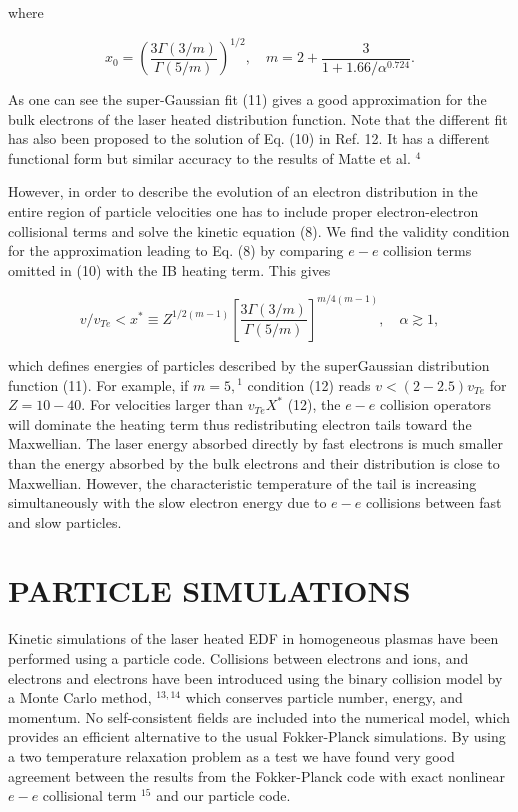\documentclass[10pt]{article}
\begin{document}
where

$$
x_{0}=\left(\frac{3 \Gamma(3 / m)}{\Gamma(5 / m)}\right)^{1 / 2}, \quad m=2+\frac{3}{1+1.66 / \alpha^{0.724}} .
$$

As one can see the super-Gaussian fit (11) gives a good approximation for the bulk electrons of the laser heated distribution function. Note that the different fit has also been proposed to the solution of Eq. (10) in Ref. 12. It has a different functional form but similar accuracy to the results of Matte et al. ${ }^{4}$

However, in order to describe the evolution of an electron distribution in the entire region of particle velocities one has to include proper electron-electron collisional terms and solve the kinetic equation (8). We find the validity condition for the approximation leading to Eq. (8) by comparing $e-e$ collision terms omitted in (10) with the IB heating term. This gives

$$
v / v_{T e}<x^{*} \equiv Z^{1 / 2(m-1)}\left[\frac{3 \Gamma(3 / m)}{\Gamma(5 / m)}\right]^{m / 4(m-1)}, \quad \alpha \gtrsim 1,
$$

which defines energies of particles described by the superGaussian distribution function (11). For example, if $m=5,{ }^{1}$ condition (12) reads $v<(2-2.5) v_{T e}$ for $Z=10-40$. For velocities larger than $v_{T e} X^{*}$ (12), the $e-e$ collision operators will dominate the heating term thus redistributing electron tails toward the Maxwellian. The laser energy absorbed directly by fast electrons is much smaller than the energy absorbed by the bulk electrons and their distribution is close to Maxwellian. However, the characteristic temperature of the tail is increasing simultaneously with the slow electron energy due to $e-e$ collisions between fast and slow particles.

\section{PARTICLE SIMULATIONS}
Kinetic simulations of the laser heated EDF in homogeneous plasmas have been performed using a particle code. Collisions between electrons and ions, and electrons and electrons have been introduced using the binary collision model by a Monte Carlo method, ${ }^{13,14}$ which conserves particle number, energy, and momentum. No self-consistent fields are included into the numerical model, which provides an efficient alternative to the usual Fokker-Planck simulations. By using a two temperature relaxation problem as a test we have found very good agreement between the results from the Fokker-Planck code with exact nonlinear $e-e$ collisional term ${ }^{15}$ and our particle code.
\end{document}
